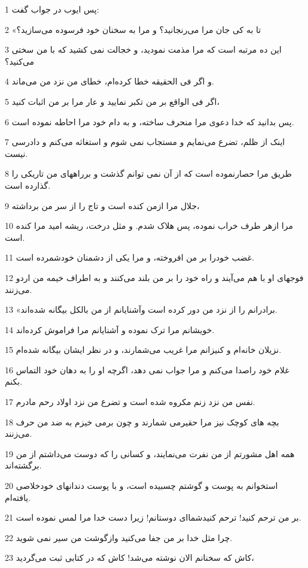 \par 1 پس ایوب در جواب گفت:
\par 2 «تا به کی جان مرا می‌رنجانید؟ و مرا به سخنان خود فرسوده می‌سازید؟
\par 3 این ده مرتبه است که مرا مذمت نمودید، و خجالت نمی کشید که با من سختی می‌کنید؟
\par 4 و اگر فی الحقیقه خطا کرده‌ام، خطای من نزد من می‌ماند.
\par 5 اگر فی الواقع بر من تکبر نمایید و عار مرا بر من اثبات کنید،
\par 6 پس بدانید که خدا دعوی مرا منحرف ساخته، و به دام خود مرا احاطه نموده است.
\par 7 اینک از ظلم، تضرع می‌نمایم و مستجاب نمی شوم و استغاثه می‌کنم و دادرسی نیست.
\par 8 طریق مرا حصارنموده است که از آن نمی توانم گذشت و برراههای من تاریکی را گذارده است.
\par 9 جلال مرا ازمن کنده است و تاج را از سر من برداشته،
\par 10 مرا ازهر طرف خراب نموده، پس هلاک شدم. و مثل درخت، ریشه امید مرا کنده است.
\par 11 غضب خودرا بر من افروخته، و مرا یکی از دشمنان خودشمرده است.
\par 12 فوجهای او با هم می‌آیند و راه خود را بر من بلند می‌کنند و به اطراف خیمه من اردو می‌زنند.
\par 13 «برادرانم را از نزد من دور کرده است وآشنایانم از من بالکل بیگانه شده‌اند.
\par 14 خویشانم مرا ترک نموده و آشنایانم مرا فراموش کرده‌اند.
\par 15 نزیلان خانه‌ام و کنیزانم مرا غریب می‌شمارند، و در نظر ایشان بیگانه شده‌ام.
\par 16 غلام خود راصدا می‌کنم و مرا جواب نمی دهد، اگر‌چه او را به دهان خود التماس بکنم.
\par 17 نفس من نزد زنم مکروه شده است و تضرع من نزد اولاد رحم مادرم.
\par 18 بچه های کوچک نیز مرا حقیرمی شمارند و چون برمی خیزم به ضد من حرف می‌زنند.
\par 19 همه اهل مشورتم از من نفرت می‌نمایند، و کسانی را که دوست می‌داشتم از من برگشته‌اند.
\par 20 استخوانم به پوست و گوشتم چسبیده است، و با پوست دندانهای خودخلاصی یافته‌ام.
\par 21 بر من ترحم کنید! ترحم کنیدشما‌ای دوستانم! زیرا دست خدا مرا لمس نموده است.
\par 22 چرا مثل خدا بر من جفا می‌کنید وازگوشت من سیر نمی شوید.
\par 23 کاش که سخنانم الان نوشته می‌شد! کاش که در کتابی ثبت می‌گردید،
